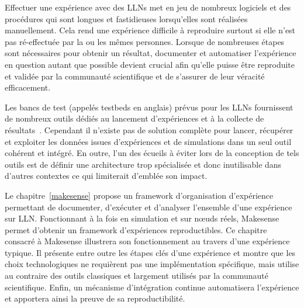 
Effectuer une expérience avec des \ac{LLN}s met en jeu de nombreux logiciels et des procédures qui sont longues et fastidieuses lorsqu'elles sont réalisées manuellement.
Cela rend une expérience difficile à reproduire surtout si elle n'est pas ré-effectuée par la ou les mêmes personnes.
Lorsque de nombreuses étapes sont nécessaires pour obtenir un résultat, documenter et automatiser l'expérience en question autant que possible devient crucial afin qu'elle puisse être reproduite et validée par la communauté scientifique et de s'assurer de leur véracité efficacement.


Les bancs de test (appelés testbeds en anglais) prévus pour les \ac{LLN}s fournissent de nombreux outils dédiés au lancement d'expériences et à la collecte de résultats~\cite{buchert2015survey,fleury2015fit}.
Cependant il n'existe pas de solution complète pour lancer, récupérer et exploiter les données issues d'expériences et de simulations dans un seul outil cohérent et intégré.
En outre, l'un des écueils à éviter lors de la conception de tels outils est de définir une architecture trop spécialisée et donc inutilisable dans d'autres contextes ce qui limiterait d'emblée son impact.


Le chapitre~\ref{makesense} propose un framework d'organisation d'expérience permettant de documenter, d'exécuter et d'analyser l'ensemble d'une expérience sur \ac{LLN}.
Fonctionnant à la fois en simulation et sur nœuds réels, Makesense permet d'obtenir un framework d'expériences reproductibles.
Ce chapitre consacré à Makesense illustrera son fonctionnement au travers d'une expérience typique.
Il présente entre outre les étapes clés d'une expérience et montre que les choix technologiques ne requièrent pas une implémentation spécifique, mais utilise au contraire des outils classiques et largement utilisés par la communauté scientifique.
Enfin, un mécanisme d'intégration continue automatisera l'expérience et apportera ainsi la preuve de sa reproductibilité.

